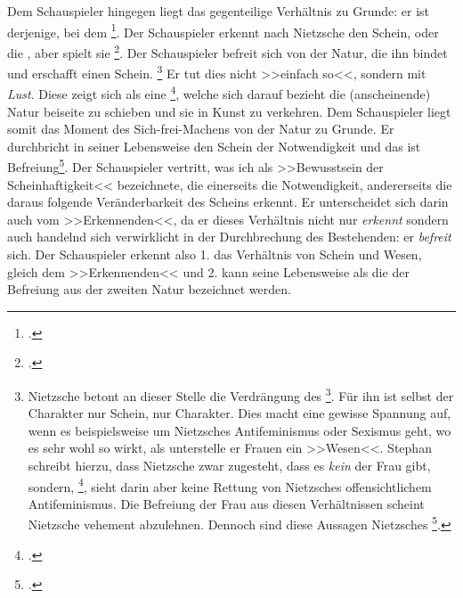 \documentclass[12pt, a4paper, openany]{report}
\begin{document}
Dem Schauspieler hingegen liegt das gegenteilige Verhältnis zu Grunde: 
er ist derjenige, bei dem \footcite[][596]{nietzsche_morgenrote_1999}.
Der Schauspieler erkennt nach Nietzsche den Schein, oder die , aber spielt sie \footcite[][608]{nietzsche_morgenrote_1999}.
Der Schauspieler befreit sich von der Natur, die ihn bindet und erschafft einen Schein.%
\footnote{
    Nietzsche betont an dieser Stelle die Verdrängung des \footcite[][608]{nietzsche_morgenrote_1999}.
    Für ihn ist selbst der Charakter nur Schein, nur  Charakter.
    Dies macht eine gewisse Spannung auf, wenn es beispielsweise um Nietzsches Antifeminismus oder Sexismus geht, wo es sehr wohl so wirkt, als unterstelle er Frauen ein >>Wesen<<.
    Stephan schreibt hierzu, dass Nietzsche zwar zugesteht, dass es \emph{kein}  der Frau gibt, sondern, \footcite[Vgl.][50]{stephan_nietzscheanismus_2019}, sieht darin aber keine Rettung von Nietzsches offensichtlichem Antifeminismus.
    Die Befreiung der Frau aus diesen Verhältnissen scheint Nietzsche vehement abzulehnen.
    Dennoch sind diese Aussagen Nietzsches \footcite[][61]{stephan_nietzscheanismus_2019}.
}
Er tut dies nicht >>einfach so<<, sondern mit \emph{Lust}.
Diese  zeigt sich als eine \footcite[][608]{nietzsche_morgenrote_1999}, welche sich darauf bezieht die (anscheinende) Natur beiseite zu schieben und sie in Kunst zu verkehren.
Dem Schauspieler liegt somit das Moment des Sich-frei-Machens von der Natur zu Grunde. 
Er durchbricht in seiner Lebensweise den Schein der Notwendigkeit und das ist Befreiung\footcite[Vgl.][41]{menke_autonomie_2018}.
Der Schauspieler vertritt, was ich als >>Bewusstsein der Scheinhaftigkeit<< bezeichnete, die einerseits die Notwendigkeit, andererseits die daraus folgende Veränderbarkeit des Scheins erkennt.
Er unterscheidet sich darin auch vom >>Erkennenden<<, da er dieses Verhältnis nicht nur \emph{erkennt} sondern auch handelnd sich verwirklicht in der Durchbrechung des Bestehenden: 
er \emph{befreit} sich.
Der Schauspieler erkennt also 1. das Verhältnis von Schein und Wesen, gleich dem >>Erkennenden<< und 2. kann seine Lebensweise als die der Befreiung aus der zweiten Natur bezeichnet werden. 
\\
\end{document}
